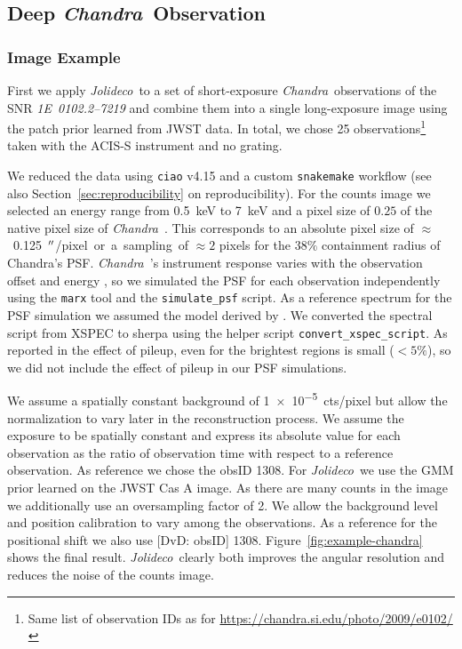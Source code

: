 \documentclass[twocolumn]{aastex631}
\newcommand{\chandra}{\textit{Chandra}~}
\newcommand{\jolideco}{\textit{Jolideco}~}
\newcommand{\dvd}[1]{{\color{red} [DvD: #1]}}
\begin{document}
    \subsection{Deep \chandra Observation}
    \subsubsection{Image Example}
    First we apply \jolideco to a set of short-exposure \chandra observations of the SNR \textit{1E~0102.2–7219} and combine them into a single long-exposure image using the patch prior learned from JWST data. In total, we chose 25 observations\footnote{Same list of observation IDs as for \url{https://chandra.si.edu/photo/2009/e0102/}} taken with  the ACIS-S instrument and no grating. 

    We reduced the data using \texttt{ciao} v4.15 and a custom \texttt{snakemake} workflow (see also Section~\ref{sec:reproducibility} on reproducibility). For the counts image we selected an energy range from \qty[mode = text]{0.5}{keV} to  \qty[mode = text]{7}{keV} and a pixel size of $0.25$ of the native pixel size of \chandra. This corresponds to an absolute  pixel size of $\approx$~\qty[mode = text]{0.125}{$\mbox{$^{\prime\prime}$}$/pixel} or a sampling of $\approx2$ pixels for the $38\%$ containment radius of Chandra's PSF. \chandra's instrument response varies with the observation offset and energy \citep{ChandraPOG2022}, so we simulated the PSF for each observation independently using the \texttt{marx} tool \citep{Davis2012} and the \texttt{simulate\_psf} script. As a reference spectrum for the PSF simulation we assumed the model derived by \cite{Plucinsky2017}. We converted the spectral script from XSPEC to sherpa using the helper script \texttt{convert\_xspec\_script}. As reported in \cite{Xi2019} the effect of pileup, even for the brightest regions is small ($<5\%$), so we did not include the effect of pileup in our PSF simulations. 

    We assume a spatially constant background of \qty[mode = text]{1e-5}{cts/pixel} but allow the normalization to vary later in the reconstruction process. We assume the exposure to be spatially constant and express its absolute value for each observation as the ratio of observation time with respect to a reference observation. As reference we chose the %
    obsID 1308. For \jolideco we use the GMM prior learned on the JWST Cas A image. As there are many counts in the image we additionally use an oversampling factor of 2. We allow the background level and position calibration to vary among the observations. As a reference for the positional shift we also use \dvd{obsID} 1308. Figure~\ref{fig:example-chandra} shows the final result. \jolideco clearly both improves the angular resolution and reduces the noise of the counts image. 
\end{document}

